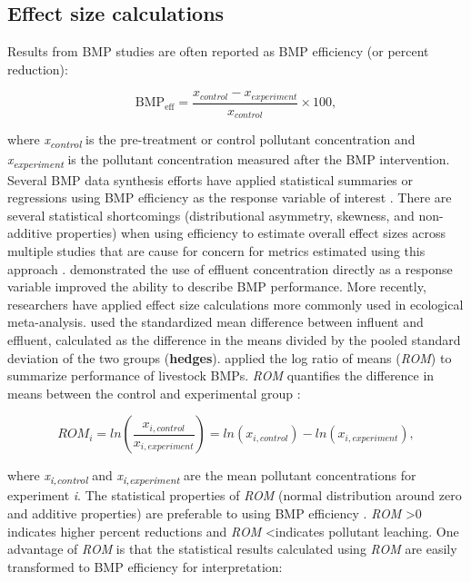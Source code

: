 \documentclass[utf8]{FrontiersinHarvard}
\begin{document}
\hypertarget{effect-size-calculations}{%
\subsection{Effect size calculations}\label{effect-size-calculations}}

Results from BMP studies are often reported as BMP efficiency (or percent reduction):

\[
\text{BMP}_{\text{eff}}=\frac{x_{control}-x_{experiment}}{x_{control}}\times 100,
\]

where \emph{x\textsubscript{control}} is the pre-treatment or control pollutant concentration and \emph{x\textsubscript{experiment}} is the pollutant concentration measured after the BMP intervention.
Several BMP data synthesis efforts have applied statistical summaries or regressions using BMP efficiency as the response variable of interest \citep{agouridisLivestockGrazingManagement2005, claryBMPPerformanceAnalysis2011, kochNitrogenRemovalStormwater2014, krogerReviewBestManagement2012, liuReviewEffectivenessBest2017, simpsonDevelopingBestManagement2009}.
There are several statistical shortcomings (distributional asymmetry, skewness, and non-additive properties) when using efficiency to estimate overall effect sizes across multiple studies that are cause for concern for metrics estimated using this approach \citep{nuzzoPercentDifferencesAnother2018, coleStatisticsNotesWhat2017}.
\citet{barrettPerformanceComparisonStructural2005} demonstrated the use of effluent concentration directly as a response variable improved the ability to describe BMP performance.
More recently, researchers have applied effect size calculations more commonly used in ecological meta-analysis.
\citet{horvathEffectsRegionalClimate2023} used the standardized mean difference between influent and effluent, calculated as the difference in the means divided by the pooled standard deviation of the two groups (\textbf{hedges}).
\citet{grudzinskiDoesRiparianFencing2020} applied the log ratio of means (\emph{ROM}) to summarize performance of livestock BMPs.
\emph{ROM} quantifies the difference in means between the control and experimental group \citep{hedgesMetaanalysisResponseRatios1999}:

\[
ROM_i = ln\left(\frac{x_{i,control}}{x_{i,experiment}}\right) = ln(x_{i, control})-ln(x_{i, experiment}),
\]

where \emph{x\textsubscript{i,control}} and \emph{x\textsubscript{i,experiment}} are the mean pollutant concentrations for experiment \emph{i}.
The statistical properties of \emph{ROM} (normal distribution around zero and additive properties) are preferable to using BMP efficiency \citep{osenbergEffectSizeEcological1997, hedgesMetaanalysisResponseRatios1999}.
\emph{ROM} \textgreater 0 indicates higher percent reductions and \emph{ROM} \textless indicates pollutant leaching.
One advantage of \emph{ROM} is that the statistical results calculated using \emph{ROM} are easily transformed to BMP efficiency for interpretation:
\end{document}
